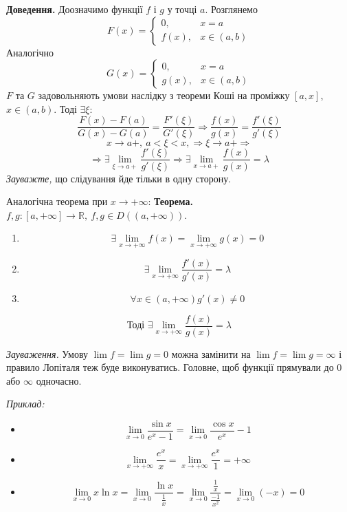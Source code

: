 \documentclass[12pt]{report}
\begin{document}
\textbf{Доведення.} Доозначимо функції $f$ і  $g$ у точці $a$. Розглянемо 
$$F(x) = \begin{cases} 0,& x = a \\
						f(x),& x \in (a,b)\end{cases}$$
Аналогічно
$$G(x) = \begin{cases} 0,& x = a \\
						g(x),& x \in (a,b)\end{cases}$$
$F$ та $G$ задовольняють умови наслідку з теореми Коші на проміжку $[a,x]$, $x \in (a,b)$. Тоді $\exists \xi:$
$$\frac{F(x) - F(a)}{G(x) - G(a)} = \frac{F'(\xi)}{G'(\xi)} \Longrightarrow \frac{f(x)}{g(x)} = \frac{f'(\xi)}{g'(\xi)}$$
$$x \to a+,\ a < \xi < x, \Longrightarrow \xi \to a+ \Longrightarrow $$
$$\Longrightarrow \exists \lim_{\xi \to a+}\frac{f'(\xi)}{g'(\xi)} \Longrightarrow \exists \lim_{x\to a+}\frac{f(x)}{g(x)} = \lambda$$
\textit{Зауважте,} що слідування йде тільки в одну сторону.

\vspace{3mm}

Аналогічна теорема при $x \to +\infty$:
\textbf{Теорема.} $f,g : [a, +\infty] \to \mathbb{R},\ f,g \in D((a, +\infty))$.
\begin{enumerate}
\item $$\exists \lim_{x \to +\infty}f(x) = \lim_{x\to +\infty}g(x) = 0$$
\item $$\exists \lim_{x\to +\infty}\frac{f'(x)}{g'(x)} = \lambda$$
\item $$\forall x \in (a, +\infty) g'(x) \neq 0$$
\end{enumerate}  
$$\textrm{Тоді } \exists \lim_{x\to +\infty}\frac{f(x)}{g(x)} = \lambda$$

\textit{Зауваження.} Умову $\lim f = \lim g = 0$ можна замінити на $\lim f = \lim g = \infty$ і правило Лопіталя теж буде виконуватись. Головне, щоб функції прямували до $0$ або $\infty$ одночасно.

\textit{Приклад:}
\begin{itemize}
\item $$\lim_{x\to 0}\frac{\sin x}{e^x - 1} = \lim_{x\to 0}\frac{\cos x}{e^x} - 1$$
\item $$\lim_{x\to +\infty}\frac{e^x}{x} = \lim_{x \to +\infty}\frac{e^x}{1} = +\infty$$
\item $$\lim_{x\to 0}x \ln x = \lim_{x \to 0}\frac{\ln x}{\frac{1}{x}} = \lim_{x\to 0}\frac{\frac{1}{x}}{\frac{-1}{x^2}} = \lim_{x\to 0}(-x) = 0$$
\end{itemize}
\end{document}
